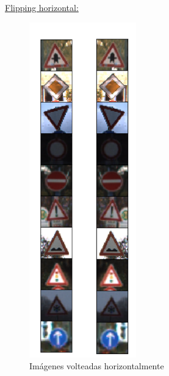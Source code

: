	\begin{multicols}{2}
		
		\underline{Flipping horizontal:}
		\begin{figure}[H]
			\begin{center}
			\includegraphics[height=14.5cm ]{images/desarrollo/Augment/flippedHorizontally}
			\end{center}
			\begin{center}
			\caption{\small{Imágenes volteadas horizontalmente}}
			\vspace{-1em}
		{\small{\fontsize{10}{16.8}\selectfont {Fuente propia}}}
			\end{center}
			\vspace{-1.5em}
		\end{figure}

	

\end{multicols}
